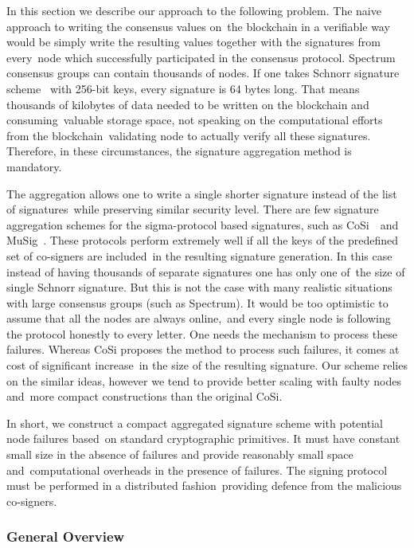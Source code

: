 In this section we describe our approach to the following problem.
The naive approach to writing the consensus values on\
the blockchain in a verifiable way would be simply write the resulting values together with the signatures from every\
node which successfully participated in the consensus protocol.
Spectrum consensus groups can contain thousands of nodes.
If one takes Schnorr signature scheme~\cite{Schnorr1991} with 256-bit keys, every signature is 64 bytes long.
That means thousands of kilobytes of data needed to be written on the blockchain and consuming\
valuable storage space, not speaking on the computational efforts from the blockchain\
validating node to actually verify all these signatures.
Therefore, in these circumstances, the signature aggregation method is mandatory.

The aggregation allows one to write a single shorter signature instead of the list of signatures\
while preserving similar security level.
There are few signature aggregation schemes for the sigma-protocol based signatures, such as CoSi~\cite{Syta2016}\
and MuSig~\cite{Itakura1983APC}.
These protocols perform extremely well if all the keys of the predefined set of co-signers are included\
in the resulting signature generation.
In this case instead of having thousands of separate signatures one has only one of\
the size of single Schnorr signature.
But this is not the case with many realistic situations with large consensus groups (such as Spectrum).
It would be too optimistic to assume that all the nodes are always online,\
and every single node is following the protocol honestly to every letter.
One needs the mechanism to process these failures.
Whereas CoSi proposes the method to process such failures, it comes at cost of significant increase\
in the size of the resulting signature.
Our scheme relies on the similar ideas, however we tend to provide better scaling with faulty nodes and\
more compact constructions than the original CoSi.

In short, we construct a compact aggregated signature scheme with potential node failures based\
on standard cryptographic primitives.
It must have constant small size in the absence of failures and provide reasonably small space and\
computational overheads in the presence of failures.
The signing protocol must be performed in a distributed fashion\
providing defence from the malicious co-signers.

\subsubsection{General Overview}

